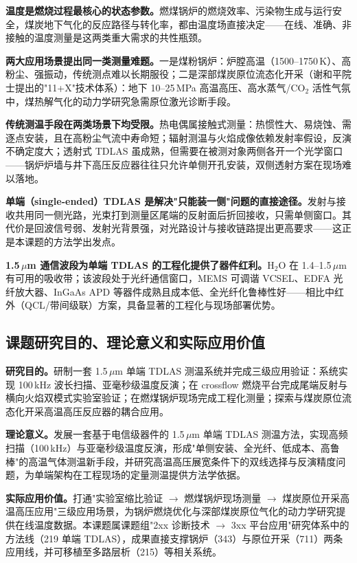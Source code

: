 \documentclass[12pt,a4paper]{article}
\begin{document}
\textbf{温度是燃烧过程最核心的状态参数。}燃煤锅炉的燃烧效率、污染物生成与运行安全，煤炭地下气化的反应路径与转化率，都由温度场直接决定——在线、准确、非接触的温度测量是这两类重大需求的共性瓶颈。

\textbf{两大应用场景提出同一类测量难题。}一是煤粉锅炉：炉膛高温（1500--1750\,K）、高粉尘、强振动，传统测点难以长期服役；二是深部煤炭原位流态化开采（谢和平院士提出的"11+X"技术体系）：地下 10--25\,MPa 高温高压、高水蒸气/CO$_2$ 活性气氛中，煤热解气化的动力学研究急需原位激光诊断手段。

\textbf{传统测温手段在两类场景下均受限。}热电偶属接触式测量：热惯性大、易烧蚀、需逐点安装，且在高粉尘气流中寿命短；辐射测温与火焰成像依赖发射率假设，反演不确定度大；透射式 TDLAS 虽成熟，但需要在被测对象两侧各开一个光学窗口——锅炉炉墙与井下高压反应器往往只允许单侧开孔安装，双侧透射方案在现场难以落地。

\textbf{单端（single-ended）TDLAS 是解决"只能装一侧"问题的直接途径。}发射与接收共用同一侧光路，光束打到测量区尾端的反射面后折回接收，只需单侧窗口。其代价是回波信号弱、发射光背景强，对光路设计与接收链路提出更高要求——这正是本课题的方法学出发点。

\textbf{1.5\,$\mu$m 通信波段为单端 TDLAS 的工程化提供了器件红利。}H$_2$O 在 1.4--1.5\,$\mu$m 有可用的吸收带；该波段处于光纤通信窗口，MEMS 可调谐 VCSEL、EDFA 光纤放大器、InGaAs APD 等器件成熟且成本低、全光纤化鲁棒性好——相比中红外（QCL/带间级联）方案，具备显著的工程化与现场部署优势。

\subsection{课题研究目的、理论意义和实际应用价值}

\textbf{研究目的。}研制一套 1.5\,$\mu$m 单端 TDLAS 测温系统并完成三级应用验证：系统实现 100\,kHz 波长扫描、亚毫秒级温度反演；在 crossflow 燃烧平台完成尾端反射与横向火焰双模式实验室验证；在燃煤锅炉现场完成工程化测量；探索与煤炭原位流态化开采高温高压反应器的耦合应用。

\textbf{理论意义。}发展一套基于电信级器件的 1.5\,$\mu$m 单端 TDLAS 测温方法，实现高频扫描（100\,kHz）与亚毫秒级温度反演，形成"单侧安装、全光纤、低成本、高鲁棒"的高温气体测温新手段，并研究高温高压展宽条件下的双线选择与反演精度问题，为单端架构在工程现场的定量测温提供方法学依据。

\textbf{实际应用价值。}打通"实验室缩比验证 $\rightarrow$ 燃煤锅炉现场测量 $\rightarrow$ 煤炭原位开采高温高压应用"三级应用场景，为锅炉燃烧优化与深部煤炭原位气化的动力学研究提供在线温度数据。本课题属课题组"2xx 诊断技术 $\rightarrow$ 3xx 平台应用"研究体系中的方法线（219 单端 TDLAS），成果直接支撑锅炉（343）与原位开采（711）两条应用线，并可移植至多路层析（215）等相关系统。
\end{document}
